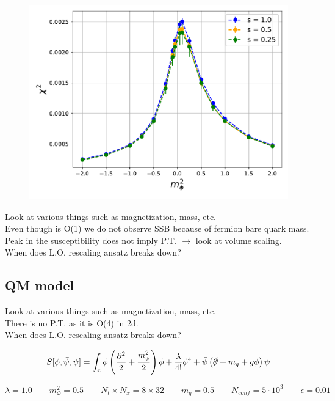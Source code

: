 \begin{figure}
    \centering
    \includegraphics[scale=0.7]{figures/phase_trans/chi2.pdf}
    \caption{}
    \label{fig:chi_volume_scaling}
\end{figure}


Look at various things such as magnetization, mass, etc. \\
Even though is O(1) we do not observe SSB because of fermion bare quark mass. \\
Peak in the susceptibility does not imply P.T. $\rightarrow$ look at volume scaling. \\
When does L.O. rescaling ansatz breaks down?
\subsection{QM model}
Look at various things such as magnetization, mass, etc. \\
There is no P.T. as it is O(4) in 2d. \\
When does L.O. rescaling ansatz breaks down?

\newpage

\begin{equation*}
    S[\phi, \bar\psi, \psi] = \int_x \phi \left(\frac{\partial^2}{2} + \frac{m_\phi^2}{2}\right) \phi + \frac{\lambda}{4!} \phi^4 + \bar \psi \left(\slashed{\partial} + m_q + g\phi\right) \psi
\end{equation*}

\begin{equation*} 
    \lambda = 1.0 \qquad m_\Phi^2 = 0.5 \qquad N_t \times N_x = 8 \times 32 \qquad m_q = 0.5 \qquad N_{conf} = 5 \cdot 10^3 \qquad \bar\epsilon = 0.01
\end{equation*}

